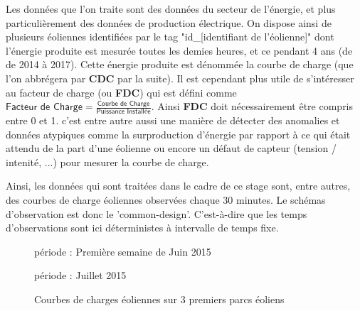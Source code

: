 
Les données que l'on traite sont des données du secteur de l'énergie, et plus particulièrement des données de production électrique. On dispose ainsi de plusieurs éoliennes identifiées par le tag "id\_[identifiant de l'éolienne]" dont l'énergie produite est mesurée toutes les demies heures, et ce pendant 4 ans (de de 2014 à 2017). 
Cette énergie produite est dénommée la courbe de charge (que l'on abbrégera par \textbf{CDC} par la suite). Il est cependant plus utile de s'intéresser au facteur de charge (ou \textbf{FDC}) qui est défini comme 
$\displaystyle\textsf{Facteur de Charge} = \frac{\textsf{Courbe de Charge}}{\textsf{Puissance Installée}}$.
Ainsi \textbf{FDC} doit nécessairement être compris entre 0 et 1. c'est entre autre aussi une manière de détecter des anomalies et données atypiques comme la surproduction d'énergie par rapport à ce qui était attendu de la part d'une éolienne ou encore un défaut de capteur (tension / intenité, ...) pour mesurer la courbe de charge.

Ainsi, les données qui sont traitées dans le cadre de ce stage sont, entre autres, des courbes de charge éoliennes observées chaque 30 minutes. Le schémas d’observation est donc le 'common-design'. C'est-à-dire que les temps d'observations sont ici déterministes à intervalle de temps fixe.

\begin{figure}[H]
    \centering
    période : Première semaine de Juin 2015
    

    période : Juillet 2015
        
    \caption{Courbes de charges éoliennes sur 3 premiers parcs éoliens}
    \label{fig:courbes_de_charge}
\end{figure}
